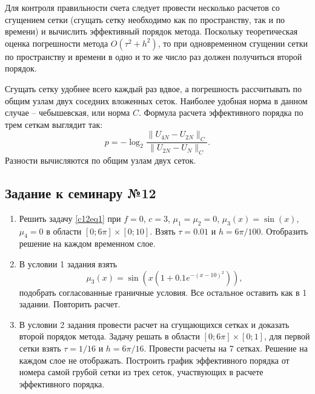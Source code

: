Для контроля правильности счета следует провести несколько расчетов со сгущением сетки (сгущать сетку необходимо как по пространству, так и по времени) и вычислить эффективный порядок метода. Поскольку теоретическая оценка погрешности метода $O\left( \tau^2 + h^2 \right)$, то при одновременном сгущении сетки по пространству и времени в одно и то же число раз должен получиться второй порядок.

Сгущать сетку удобнее всего каждый раз вдвое, а погрешность рассчитывать  по общим узлам двух соседних вложенных сеток. Наиболее удобная норма в данном случае – чебышевская, или норма $C$. Формула расчета эффективного порядка по трем сеткам выглядит так:
\begin{equation} \label{c12eq6}
	p = - \log_2 \frac{\| U_{4N} - U_{2N} \|_C}{\| U_{2N} - U_N \|_C}.
\end{equation}
Разности вычисляются по общим узлам двух сеток.

\subsection{Задание к семинару №12}
\begin{enumerate}
\item Решить задачу \eqref{c12eq1} при $f = 0$, $c = 3$, $\mu_1 = \mu_2 = 0$, $\mu_3(x) = \sin (x)$, $\mu_4 = 0$ в области $[0; 6\pi] \times [0; 10]$. Взять $\tau = 0.01$ и $h = 6\pi/100$. Отобразить решение на каждом временном слое.
\item В условии 1 задания взять 
\begin{equation} \nonumber
	\mu_3(x) = \sin \left( x \left( 1 + 0.1 e^{-(x-10)^2}\right) \right),
\end{equation}
подобрать согласованные граничные условия. Все остальное оставить как в 1 задании. Повторить расчет.
\item В условии 2 задания провести расчет на сгущающихся сетках и доказать второй порядок метода. Задачу решать в области $[0; 6\pi] \times [0; 1]$, для первой сетки взять $\tau = 1/16$ и $h = 6\pi/16$. Провести расчеты на 7 сетках. Решение на каждом слое не отображать. Построить график эффективного порядка от номера самой грубой сетки из трех сеток, участвующих в расчете эффективного порядка.
\end{enumerate}

